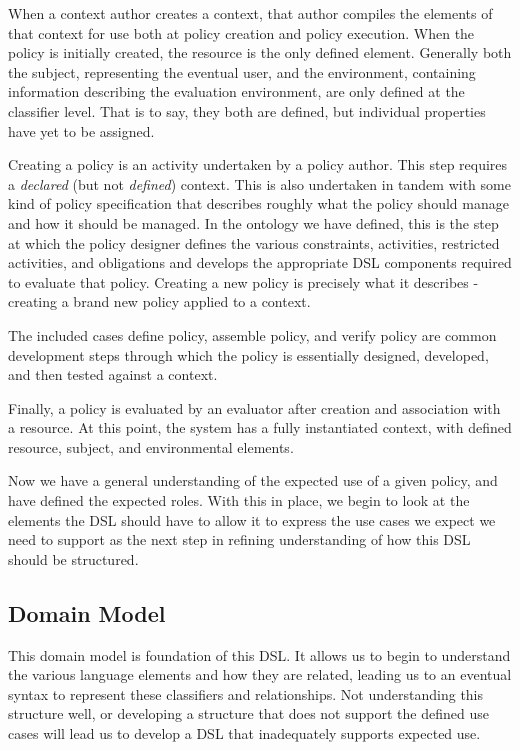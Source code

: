 When a context author creates a context, that author compiles the elements of that context for use both at policy creation and policy execution.  When the policy is initially created, the resource is the only defined element.  Generally both the subject, representing the eventual user, and the environment, containing information describing the evaluation environment, are only defined at the classifier level.  That is to say, they both are defined, but individual properties have yet to be assigned.

Creating a policy is an activity undertaken by a policy author.  This step requires a \emph{declared} (but not \emph{defined}) context.  This is also undertaken in tandem with some kind of policy specification that describes roughly what the policy should manage and how it should be managed.  In the ontology we have defined, this is the step at which the policy designer defines the various constraints, activities, restricted activities, and obligations and develops the appropriate DSL components required to evaluate that policy.  Creating a new policy is precisely what it describes - creating a brand new policy applied to a context.

The included cases define policy, assemble policy, and verify policy are common development steps through which the policy is essentially designed, developed, and then tested against a context.

Finally, a policy is evaluated by an evaluator after creation and association with a resource.  At this point, the system has a fully instantiated context, with defined resource, subject, and environmental elements.

Now we have a general understanding of the expected use of a given policy, and have defined the expected roles.  With this in place, we begin to look at the elements the DSL should have to allow it to express the use cases we expect we need to support as the next step in refining understanding of how this DSL should be structured.

\subsection{Domain Model}
This domain model is foundation of this DSL.  It allows us to begin to understand the various language elements and how they are related, leading us to an eventual syntax to represent these classifiers and relationships.  Not understanding this structure well, or developing a structure that does not support the defined use cases will lead us to develop a DSL that inadequately supports expected use.

